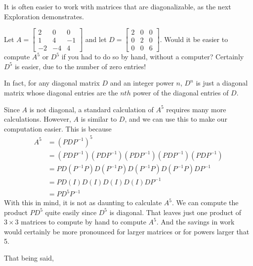 \documentclass{ximera}
\begin{document}
  It is often easier to work with matrices that are diagonalizable, as the next Exploration demonstrates. 
   
  \begin{example}\label{ex:diagonalizematrix2}

  Let $A=\begin{bmatrix}
  2 & 0 & 0 \\
  1 & 4 & -1 \\
  -2 & -4 & 4
  \end{bmatrix}$ and let $D=\begin{bmatrix}
  2 & 0 & 0 \\
  0 & 2 & 0 \\
  0 & 0 & 6
  \end{bmatrix}$. 
  Would it be easier to compute $A^5$ or $D^5$ if you had to do so by hand, without a computer?  Certainly $D^5$ is easier, due to the number of zero entries!  
   
  In fact, for any diagonal matrix $D$ and an integer power $n$, $D^n$ is just a diagonal matrix whose diagonal entries are the $nth$ power of the diagonal entries of $D$.
   
  Since $A$ is not diagonal, a standard calculation of $A^5$ requires many more calculations.  However, $A$ is similar to $D$, and we can use this to make our computation easier.  This is because
  \begin{align*}
      A^5&=\left(PDP^{-1}\right)^5 \\
         &=(PDP^{-1})(PDP^{-1})(PDP^{-1})(PDP^{-1})(PDP^{-1}) \\
         &=PD(P^{-1}P)D(P^{-1}P)D(P^{-1}P)D(P^{-1}P)DP^{-1} \\
         &=PD(I)D(I)D(I)D(I)DP^{-1} \\
         &=PD^5P^{-1}
  \end{align*}
  With this in mind, it is not as daunting to calculate $A^5$.  We can compute the product $PD^5$ quite easily since $D^5$ is diagonal.  That leaves just one product of $3 \times 3$ matrices to compute by hand to compute $A^5$.  And the savings in work would certainly be more pronounced for larger matrices or for powers larger that 5.

  That being said, 


\end{example}
\end{document}
